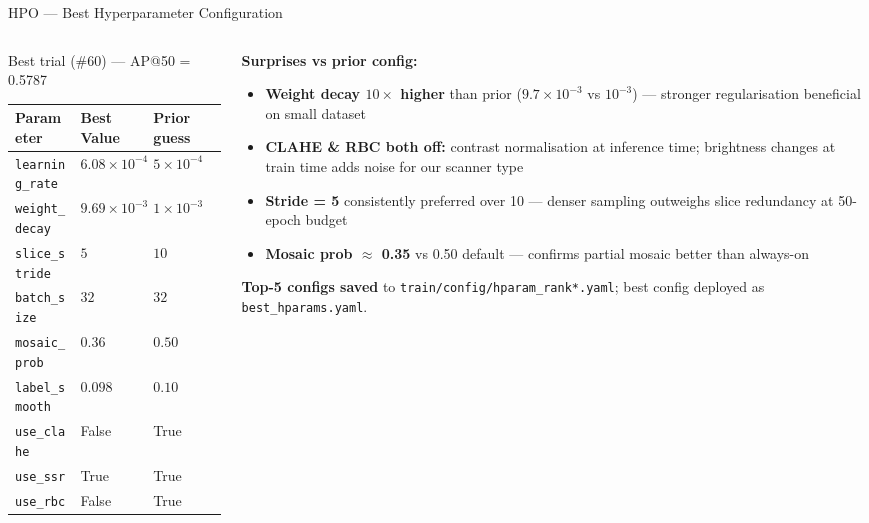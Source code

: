 \documentclass[aspectratio=169, 10pt]{beamer}
\begin{document}
\begin{frame}{HPO — Best Hyperparameter Configuration}
  \begin{columns}[T]
    \begin{column}{0.50\textwidth}
      \begin{block}{\small Best trial (\#60) — AP@50 = 0.5787}
        \small
        \begin{tabular}{lll}
          \toprule
          Parameter & Best Value & Prior guess \\
          \midrule
          \texttt{learning\_rate}   & $6.08 \times 10^{-4}$ & $5 \times 10^{-4}$ \\
          \rowcolor{rowhl}
          \texttt{weight\_decay}    & $9.69 \times 10^{-3}$ & $1 \times 10^{-3}$ \\
          \texttt{slice\_stride}    & $5$ & $10$ \\
          \rowcolor{rowhl}
          \texttt{batch\_size}      & $32$ & $32$ \\
          \texttt{mosaic\_prob}     & $0.36$ & $0.50$ \\
          \rowcolor{rowhl}
          \texttt{label\_smooth}    & $0.098$ & $0.10$ \\
          \texttt{use\_clahe}       & \color{bad}False & True \\
          \rowcolor{rowhl}
          \texttt{use\_ssr}         & \color{good}True & True \\
          \texttt{use\_rbc}         & \color{bad}False & True \\
          \bottomrule
        \end{tabular}
      \end{block}
    \end{column}
    \begin{column}{0.46\textwidth}
      \vspace{2pt}
      \textbf{Surprises vs prior config:}
      \begin{itemize}\small
        \item \textbf{Weight decay $10\times$ higher} than prior ($9.7 \times 10^{-3}$ vs $10^{-3}$) — stronger regularisation beneficial on small dataset
        \item \textbf{CLAHE \& RBC both off:} contrast normalisation at inference time; brightness changes at train time adds noise for our scanner type
        \item \textbf{Stride = 5} consistently preferred over 10 — denser sampling outweighs slice redundancy at 50-epoch budget
        \item \textbf{Mosaic prob $\approx$ 0.35} vs 0.50 default — confirms partial mosaic better than always-on
      \end{itemize}

      \vspace{4pt}
      {\small\textbf{Top-5 configs saved} to \texttt{train/config/hparam\_rank*.yaml}; best config deployed as \texttt{best\_hparams.yaml}.}
    \end{column}
  \end{columns}
\end{frame}
\end{document}
